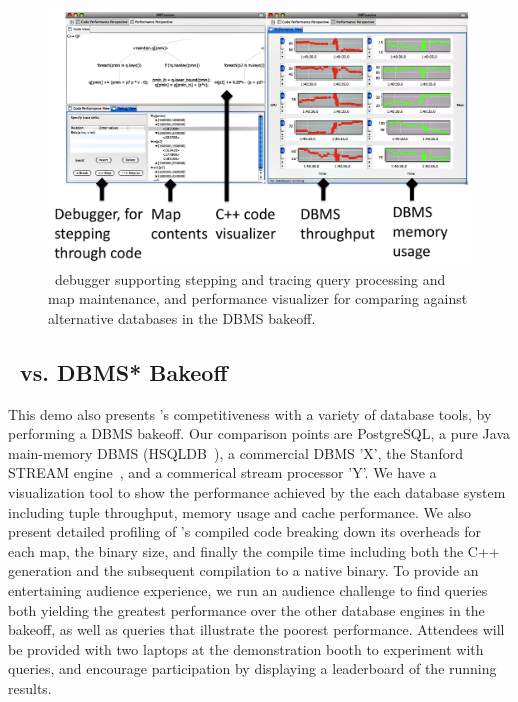 \begin{figure}[tb]
\begin{center}
\includegraphics[scale=0.088]{figures/dbt-gui2}
\end{center}
\caption{\compiler\ debugger supporting stepping and tracing query processing and
map maintenance, and performance visualizer for comparing against alternative
databases in the DBMS bakeoff.}
\label{fig:debugperfgui}
\end{figure}

\subsection{\compiler\ vs. DBMS* Bakeoff}
This demo also presents \compiler's competitiveness with a variety of database
tools, by performing a DBMS bakeoff. Our comparison points are PostgreSQL, a pure
Java main-memory DBMS (HSQLDB~\cite{hsqldb-url}), a commercial DBMS 'X', the
Stanford STREAM engine~\cite{motwani-cidr:03}, and a commerical stream processor
'Y'. We have a visualization tool to show the performance achieved by the each
database system including tuple throughput, memory usage and cache performance.
We also present detailed profiling of \compiler's compiled code breaking down its
overheads for each map, the binary size, and finally the compile time including
both the C++ generation and the subsequent compilation to a native binary. To
provide an entertaining audience experience, we run an audience challenge to find
queries both yielding the greatest performance over the other database engines in
the bakeoff, as well as queries that illustrate the poorest performance.
Attendees will be provided with two laptops at the demonstration booth to
experiment with queries, and encourage participation by displaying a leaderboard
of the running results.

